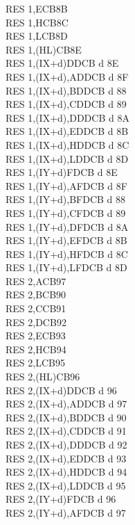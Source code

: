 \begin{multicols}{3}
{\begin{tabbing}
		RES 1,E\>CB8B\\
		RES 1,H\>CB8C\\
		RES 1,L\>CB8D\\
		RES 1,(HL)\>CB8E\\
		RES 1,(IX+d)\>DDCB d 8E\\
		RES 1,(IX+d),A\UNDOC\>DDCB d 8F\\
		RES 1,(IX+d),B\UNDOC\>DDCB d 88\\
		RES 1,(IX+d),C\UNDOC\>DDCB d 89\\
		RES 1,(IX+d),D\UNDOC\>DDCB d 8A\\
		RES 1,(IX+d),E\UNDOC\>DDCB d 8B\\
		RES 1,(IX+d),H\UNDOC\>DDCB d 8C\\
		RES 1,(IX+d),L\UNDOC\>DDCB d 8D\\
		RES 1,(IY+d)\>FDCB d 8E\\
		RES 1,(IY+d),A\UNDOC\>FDCB d 8F\\
		RES 1,(IY+d),B\UNDOC\>FDCB d 88\\
		RES 1,(IY+d),C\UNDOC\>FDCB d 89\\
		RES 1,(IY+d),D\UNDOC\>FDCB d 8A\\
		RES 1,(IY+d),E\UNDOC\>FDCB d 8B\\
		RES 1,(IY+d),H\UNDOC\>FDCB d 8C\\
		RES 1,(IY+d),L\UNDOC\>FDCB d 8D\\
		RES 2,A\>CB97\\
		RES 2,B\>CB90\\
		RES 2,C\>CB91\\
		RES 2,D\>CB92\\
		RES 2,E\>CB93\\
		RES 2,H\>CB94\\
		RES 2,L\>CB95\\
		RES 2,(HL)\>CB96\\
		RES 2,(IX+d)\>DDCB d 96\\
		RES 2,(IX+d),A\UNDOC\>DDCB d 97\\
		RES 2,(IX+d),B\UNDOC\>DDCB d 90\\
		RES 2,(IX+d),C\UNDOC\>DDCB d 91\\
		RES 2,(IX+d),D\UNDOC\>DDCB d 92\\
		RES 2,(IX+d),E\UNDOC\>DDCB d 93\\
		RES 2,(IX+d),H\UNDOC\>DDCB d 94\\
		RES 2,(IX+d),L\UNDOC\>DDCB d 95\\
		RES 2,(IY+d)\>FDCB d 96\\
		RES 2,(IY+d),A\UNDOC\>FDCB d 97\\

\end{tabbing}}
\end{multicols}
